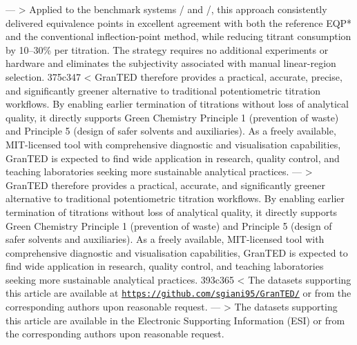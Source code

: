 ---
> Applied to the benchmark systems / and /, this approach consistently delivered equivalence points in excellent agreement with both the reference EQP* and the conventional inflection-point method, while reducing titrant consumption by 10--30\% per titration. The strategy requires no additional experiments or hardware and eliminates the subjectivity associated with manual linear-region selection.
375c347
< \textsf{GranTED} therefore provides a practical, accurate, precise, and significantly greener alternative to traditional potentiometric titration workflows. By enabling earlier termination of titrations without loss of analytical quality, it directly supports Green Chemistry Principle 1 (prevention of waste) and Principle 5 (design of safer solvents and auxiliaries). As a freely available, MIT-licensed tool with comprehensive diagnostic and visualisation capabilities, \textsf{GranTED} is expected to find wide application in research, quality control, and teaching laboratories seeking more sustainable analytical practices.
---
> \textsf{GranTED} therefore provides a practical, accurate, and significantly greener alternative to traditional potentiometric titration workflows. By enabling earlier termination of titrations without loss of analytical quality, it directly supports Green Chemistry Principle 1 (prevention of waste) and Principle 5 (design of safer solvents and auxiliaries). As a freely available, MIT-licensed tool with comprehensive diagnostic and visualisation capabilities, GranTED is expected to find wide application in research, quality control, and teaching laboratories seeking more sustainable analytical practices.
393c365
< The datasets supporting this article are available at \href{https://github.com/sgiani95/GranTED/}{\texttt{https://github.com/sgiani95/GranTED/}} or from the corresponding authors upon reasonable request.
---
> The datasets supporting this article are available in the Electronic Supporting Information (ESI) or from the corresponding authors upon reasonable request.
